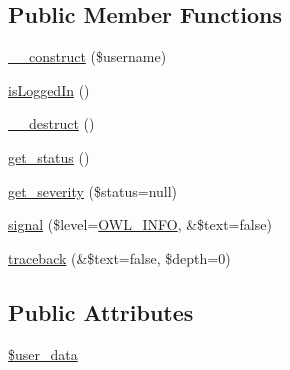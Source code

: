 \subsection*{Public Member Functions}
\begin{DoxyCompactItemize}
\item 
\hyperlink{classUserHandler_a624054e9693139a3fe5af0ef3b757f04}{\_\-\_\-construct} (\$username)
\item 
\hyperlink{classUserHandler_a4539c12ed2ce12a9147d61496854d5ab}{isLoggedIn} ()
\item 
\hyperlink{classUserHandler_a3e1f6381ed79caf6e1a255fb0a9cc386}{\_\-\_\-destruct} ()
\item 
\hyperlink{class__OWL_a99ec771fa2c5c279f80152cc09e489a8}{get\_\-status} ()
\item 
\hyperlink{class__OWL_adf9509ef96858be7bdd9414c5ef129aa}{get\_\-severity} (\$status=null)
\item 
\hyperlink{class__OWL_a51ba4a16409acf2a2f61f286939091a5}{signal} (\$level=\hyperlink{owl_8severitycodes_8php_a139328861128689f2f4def6a399d9057}{OWL\_\-INFO}, \&\$text=false)
\item 
\hyperlink{class__OWL_aa29547995d6741b7d2b90c1d4ea99a13}{traceback} (\&\$text=false, \$depth=0)
\end{DoxyCompactItemize}
\subsection*{Public Attributes}
\begin{DoxyCompactItemize}
\item 
\hyperlink{classUserHandler_ae7a2d59eee65560ac96b860e828bb445}{\$user\_\-data}
\end{DoxyCompactItemize}
